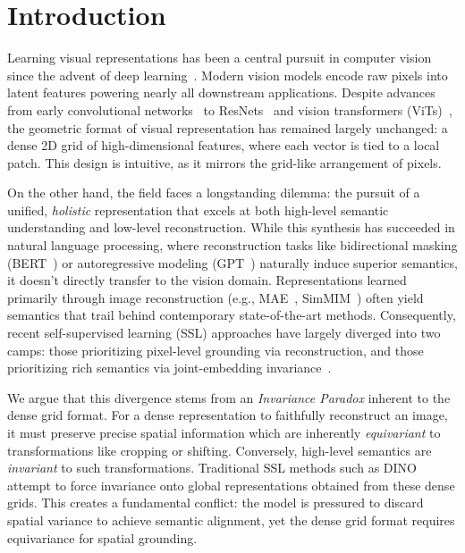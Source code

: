 \section{Introduction}

Learning visual representations has been a central pursuit in computer vision since the advent of deep learning~\citep{bengio2013representation}. Modern vision models encode raw pixels into latent features powering nearly all downstream applications. Despite advances from early convolutional networks~\citep{CNN} to ResNets~\citep{he2016deep} and vision transformers (ViTs)~\citep{dosovitskiy2020image}, the geometric format of visual representation has remained largely unchanged: a dense 2D grid of high-dimensional features, where each vector is tied to a local patch. This design is intuitive, as it mirrors the grid-like arrangement of pixels.

On the other hand, the field faces a longstanding dilemma: the pursuit of a unified, \textit{holistic} representation that excels at both high-level semantic understanding and low-level reconstruction. While this synthesis has succeeded in natural language processing, where reconstruction tasks like bidirectional masking (BERT~\cite{devlin2019bert}) or autoregressive modeling (GPT~\cite{brown2020language}) naturally induce superior semantics, it doesn't directly transfer to the vision domain. Representations learned primarily through image reconstruction (e.g., MAE~\citep{he2022masked}, SimMIM~\cite{xie2022simmim}) often yield semantics that trail behind contemporary state-of-the-art methods. Consequently, recent self-supervised learning (SSL) approaches have largely diverged into two camps: those prioritizing pixel-level grounding via reconstruction, and those prioritizing rich semantics via joint-embedding invariance~\cite{van2025joint}.

We argue that this divergence stems from an \textit{Invariance Paradox} inherent to the dense grid format. For a dense representation to faithfully reconstruct an image, it must preserve precise spatial information which are inherently \textit{equivariant} to transformations like cropping or shifting. Conversely, high-level semantics are \textit{invariant} to such transformations. Traditional SSL methods such as DINO~\cite{caron2021emerging} attempt to force invariance onto global representations obtained from these dense grids. This creates a fundamental conflict: the model is pressured to discard spatial variance to achieve semantic alignment, yet the dense grid format requires equivariance for spatial grounding.

